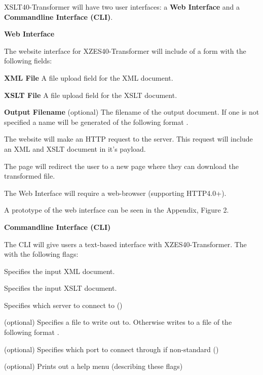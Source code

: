 XSLT40-Transformer will have two user interfaces: a \textbf{Web Interface} and a \textbf{Commandline Interface (CLI)}.

\textbf{Web Interface}

The website interface for XZES40-Transformer will include of a form with the following fields:
\begin{description}
  \item {
    \textbf{XML File} A file upload field for the XML document.
  }
  \item {
    \textbf{XSLT File} A file upload field for the XSLT document.
  }
  \item {
    \textbf{Output Filename} (optional)
    The filename of the output document.
    If one is not specified a name will be generated of the following format .
  }
\end{description}

The website will make an HTTP  request to the server.
This  request will include an XML and XSLT document in it's payload.

The page will redirect the user to a new page where they can download the transformed file.

The Web Interface will require a web-browser (supporting HTTP4.0+).

A prototype of the web interface can be seen in the Appendix, Figure 2.

\textbf{Commandline Interface (CLI)}

The CLI will give users a text-based interface with XZES40-Transformer.
The with the following flags:
\begin{description}
    \item {
      \textbf{}
      Specifies the input XML document.
    }
    \item {
      \textbf{}
      Specifies the input XSLT document.
    }
    \item {
      \textbf{}
      Specifies which server to connect to ()
    }
    \item {
      \textbf{} (optional)
      Specifies a file to write out to.  Otherwise writes to a file of the following format .
    }
    \item {
      \textbf{} (optional)
      Specifies which port to connect through if non-standard ()
    }
    \item {
      \textbf{} (optional)
      Prints out a help menu (describing these flags)
    }
\end{description}

